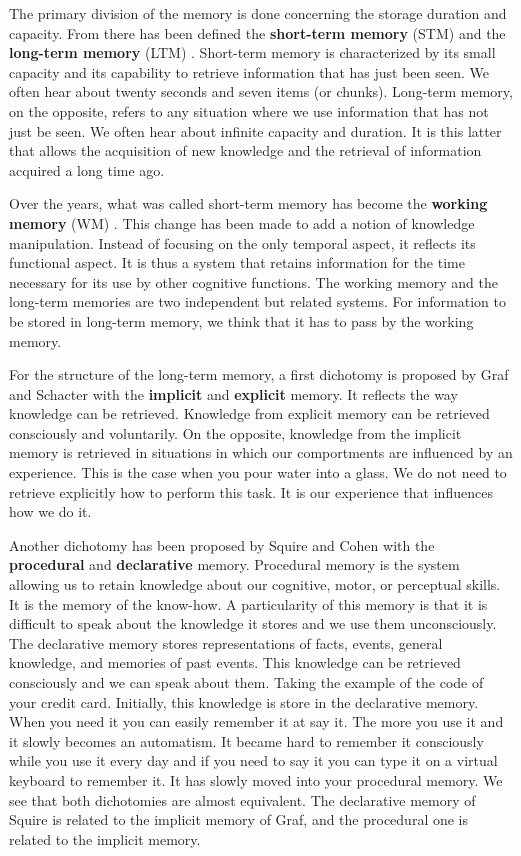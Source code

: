 The primary division of the memory is done concerning the storage duration and capacity. From there has been defined the \textbf{short-term memory} (STM) and the \textbf{long-term memory} (LTM) \cite{atkinson_1966_some}. Short-term memory is characterized by its small capacity and its capability to retrieve information that has just been seen. We often hear about twenty seconds and seven items (or chunks). Long-term memory, on the opposite, refers to any situation where we use information that has not just be seen. We often hear about infinite capacity and duration. It is this latter that allows the acquisition of new knowledge and the retrieval of information acquired a long time ago.

Over the years, what was called short-term memory has become the \textbf{working memory} (WM) \cite{baddeley_1986_dementia}. This change has been made to add a notion of knowledge manipulation. Instead of focusing on the only temporal aspect, it reflects its functional aspect. It is thus a system that retains information for the time necessary for its use by other cognitive functions. The working memory and the long-term memories are two independent but related systems. For information to be stored in long-term memory, we think that it has to pass by the working memory.

For the structure of the long-term memory, a first dichotomy is proposed by Graf and Schacter \cite{graf_1985_implicit} with the \textbf{implicit} and \textbf{explicit} memory. It reflects the way knowledge can be retrieved. Knowledge from explicit memory can be retrieved consciously and voluntarily. On the opposite, knowledge from the implicit memory is retrieved in situations in which our comportments are influenced by an experience. This is the case when you pour water into a glass. We do not need to retrieve explicitly how to perform this task. It is our experience that influences how we do it.

Another dichotomy has been proposed by Squire and Cohen \cite{squire_1982_remote} with the \textbf{procedural} and \textbf{declarative} memory. Procedural memory is the system allowing us to retain knowledge about our cognitive, motor, or perceptual skills. It is the memory of the know-how. A particularity of this memory is that it is difficult to speak about the knowledge it stores and we use them unconsciously. The declarative memory stores representations of facts, events, general knowledge, and memories of past events. This knowledge can be retrieved consciously and we can speak about them. Taking the example of the code of your credit card. Initially, this knowledge is store in the declarative memory. When you need it you can easily remember it at say it. The more you use it and it slowly becomes an automatism. It became hard to remember it consciously while you use it every day and if you need to say it you can type it on a virtual keyboard to remember it. It has slowly moved into your procedural memory. We see that both dichotomies are almost equivalent. The declarative memory of Squire is related to the implicit memory of Graf, and the procedural one is related to the implicit memory.

